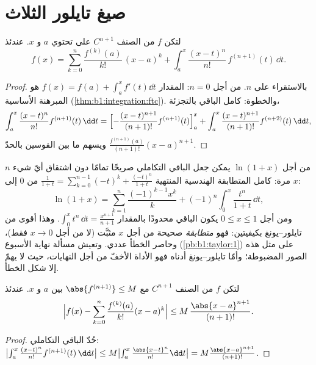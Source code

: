 \section{صيغ تايلور الثلاث}

\begin{theorem}\label{thm:b1:taylor:integral}
لتكن $f$ من الصنف $C^{n+1}$ على  تحتوي $a$ و $x$.
عندئذ
\[
f(x) = \sum_{k=0}^{n} \frac{f^{(k)}(a)}{k!}\,(x - a)^k
+ \int_a^x \frac{(x - t)^n}{n!}\, f^{(n+1)}(t)\, \dd t .
\]
\end{theorem}

\begin{proof}
بالاستقراء على $n$. من أجل $n = 0$: المقدار $f(x) = f(a) + \int_a^x f'(t)\dd t$ هو
المبرهنة الأساسية (\cref{thm:b1:integration:ftc}). والخطوة:
كامل الباقي بالتجزئة،
\[
\int_a^x \frac{(x-t)^n}{n!} f^{(n+1)}(t)\,\dd t
= \Bigl[-\frac{(x-t)^{n+1}}{(n+1)!} f^{(n+1)}(t)\Bigr]_a^x
+ \int_a^x \frac{(x-t)^{n+1}}{(n+1)!} f^{(n+2)}(t)\,\dd t ,
\]
ويسهم ما بين القوسين بالحدّ $\frac{f^{(n+1)}(a)}{(n+1)!}(x -
a)^{n+1}$.
\end{proof}

\begin{example}\label{ex:b1:taylor:lnexact}
من أجل $\ln(1 + x)$ يمكن جعل الباقي التكاملي صريحًا
تمامًا دون اشتقاق أيّ شيء $n$ مرة: كامل
المتطابقة الهندسية المنتهية $\frac{1}{1+t} =
\sum_{k=0}^{n-1}(-t)^k + \frac{(-t)^n}{1+t}$ من $0$ إلى $x$:
\[
\ln(1 + x) = \sum_{k=1}^{n} \frac{(-1)^{k-1}x^k}{k}
+ (-1)^n \int_0^x \frac{t^n}{1 + t}\,\dd t ,
\]
ومن أجل $0 \leq x \leq 1$ يكون الباقي محدودًا بالمقدار $\int_0^x
t^n\,\dd t = \frac{x^{n+1}}{n+1}$. وهذا أقوى من
تايلور--يونغ بكيفيتين: فهو \emph{متطابقة} صحيحة من أجل
$x$ مثبَّت (لا من أجل $x \to 0$ فقط)، وحاصر الخطأ عددي.
وتعيش مسألة نهاية الأسبوع (\cref{pb:b1:taylor:1}) على مثل هذه
الصور المضبوطة؛ وأمّا تايلور--يونغ أدناه فهو الأداة الأخفّ من أجل النهايات، حيث
لا يهمّ إلا شكل الخطأ.
\end{example}

\begin{theorem}\label{thm:b1:taylor:lagrange}
لتكن $f$ من الصنف $C^{n+1}$ مع $\abs{f^{(n+1)}} \leq M$ بين $a$ و
$x$. عندئذ
\[
\Bigl| f(x) - \sum_{k=0}^{n} \frac{f^{(k)}(a)}{k!}(x-a)^k \Bigr|
\leq M\, \frac{\abs{x - a}^{n+1}}{(n+1)!} .
\]
\end{theorem}

\begin{proof}
حُدّ الباقي التكاملي: $\bigl|\int_a^x \frac{(x-t)^n}{n!}
f^{(n+1)}(t)\,\dd t\bigr| \leq M \bigl|\int_a^x
\frac{\abs{x-t}^n}{n!}\dd t\bigr| = M\frac{\abs{x-a}^{n+1}}{(n+1)!}$.
\end{proof}

